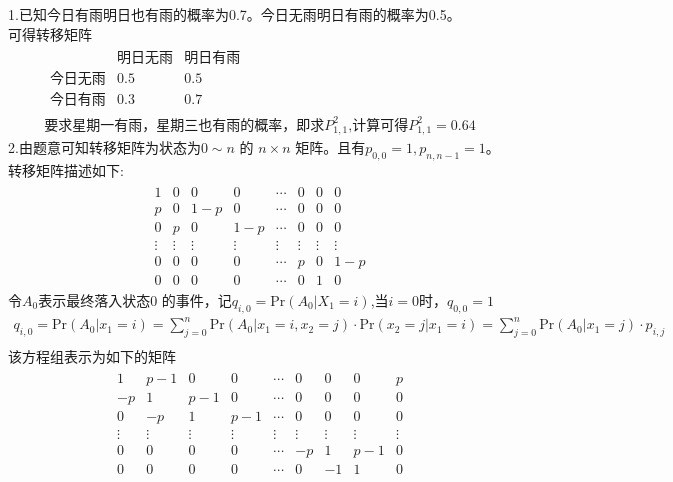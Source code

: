 \documentclass{article}
\begin{document}
    1.已知今日有雨明日也有雨的概率为0.7。今日无雨明日有雨的概率为0.5。\\
    可得转移矩阵
    \begin{gather*}
        \begin{matrix}
                    & \text{明日无雨} & \text{明日有雨}\\
            \text{今日无雨} & 0.5 & 0.5\\
            \text{今日有雨} &0.3 & 0.7    
        \end{matrix}
        \\
        \text{要求星期一有雨，星期三也有雨的概率，即求} P_{1,1}^{2}
        \text{,计算可得} P_{1,1}^{2} = 0.64
    \end{gather*}
    2.由题意可知转移矩阵为状态为$0 \sim n$ 的 $n \times n$ 矩阵。且有$p_{0,0} = 1,p_{n, n-1} = 1$。转移矩阵描述如下:\\
    \begin{gather*}
        \begin{matrix}
            1 & 0   & 0   & 0   & \cdots & 0  & 0 & 0 \\
            p & 0   & 1-p & 0   & \cdots & 0  & 0 & 0 \\
            0 & p   & 0   & 1-p & \cdots & 0  & 0 & 0  \\
            \vdots & \vdots & \vdots & \vdots & \vdots & \vdots & \vdots & \vdots\\
            0 & 0   & 0   & 0   &  \cdots & p & 0 & 1-p \\
            0 & 0   & 0   & 0   &  \cdots & 0 & 1 & 0
        \end{matrix}
    \end{gather*}
    令$A_0$表示最终落入状态0 的事件，记$q_{i,0} = \mathrm{Pr}(A_0|X_1 = i)$,当$i=0$时，$q_{0,0} = 1$\\
    \begin{gather*}
        q_{i,0} = \mathrm{Pr}(A_0|x_1 = i) 
        = \sum_{j=0}^{n} \mathrm{Pr}(A_0 | x_1 = i, x_2 = j) \cdot \mathrm{Pr}(x_2 =j|x_1=i)
        = \sum_{j=0}^{n} \mathrm{Pr}(A_0 | x_1 = j) \cdot p_{i,j}\\
    \end{gather*}
    该方程组表示为如下的矩阵\\
    \begin{gather*}
        \begin{matrix}
            1  & p-1 & 0   & 0   & \cdots & 0  & 0  & 0 & p \\
            -p & 1   & p-1 & 0   & \cdots & 0  & 0  & 0 & 0 \\
            0  & -p  & 1   & p-1 & \cdots & 0  & 0  & 0 & 0  \\
            \vdots & \vdots & \vdots & \vdots & \vdots & \vdots & \vdots & \vdots & \vdots\\
            0 & 0   & 0   & 0   &  \cdots & -p & 1  & p-1 & 0 \\
            0 & 0   & 0   & 0   &  \cdots & 0  & -1 & 1 & 0
        \end{matrix}
    \end{gather*}
\end{document}
